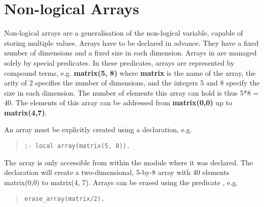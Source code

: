 \section{Non-logical Arrays} 
Non-logical arrays are a generalisation of the non-logical variable, capable of storing
multiple values.
Arrays have to be declared in advance.
They have a fixed number of dimensions and a fixed size in each dimension.
Arrays in {\eclipse} are managed solely by special predicates.
In these predicates, arrays are represented by compound terms, e.g.
{\bf matrix(5, 8)}
where {\bf matrix} is the name of the array, the arity of 2 specifies
the number of dimensions, and the integers 5 and 8 specify the size
in each dimension. The number of elements this array can hold is 
thus 5*8 = 40.
The elements of this array can be addressed from {\bf matrix(0,0)}
up to {\bf matrix(4,7)}.

An array must be explicitly created using a
declaration, e.g.
\begin{quote}\begin{verbatim}
:- local array(matrix(5, 8)).
\end{verbatim}\end{quote}
The array is only accessible from within the module where it was declared.
The declaration will create a two-dimensional, 5-by-8 array with 40 elements
matrix(0,0) to matrix(4, 7).
Arrays can be  erased using the predicate
, e.g.
\begin{quote}\begin{verbatim}
erase_array(matrix/2).
\end{verbatim}\end{quote}

